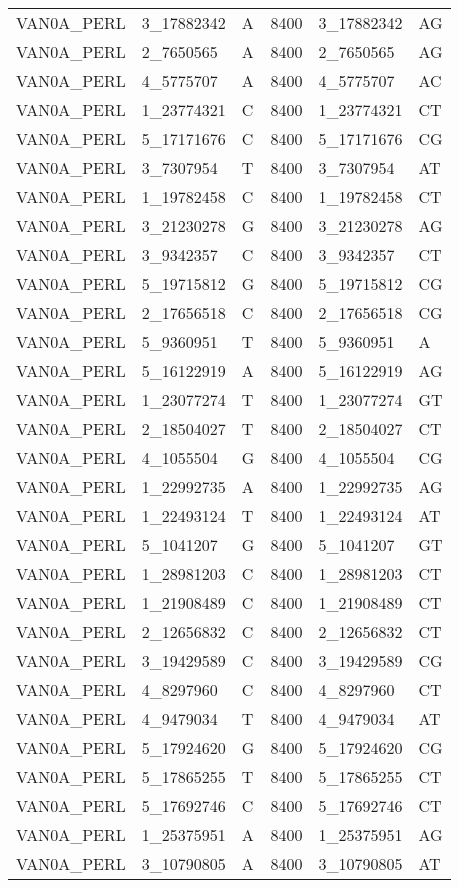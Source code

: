 \begin{center}
\begin{longtable}{|l|l|l|l|l|l|}
VAN0A\_PERL&3\_17882342&A&8400&3\_17882342&AG\\
VAN0A\_PERL&2\_7650565&A&8400&2\_7650565&AG\\
VAN0A\_PERL&4\_5775707&A&8400&4\_5775707&AC\\
VAN0A\_PERL&1\_23774321&C&8400&1\_23774321&CT\\
VAN0A\_PERL&5\_17171676&C&8400&5\_17171676&CG\\
VAN0A\_PERL&3\_7307954&T&8400&3\_7307954&AT\\
VAN0A\_PERL&1\_19782458&C&8400&1\_19782458&CT\\
VAN0A\_PERL&3\_21230278&G&8400&3\_21230278&AG\\
VAN0A\_PERL&3\_9342357&C&8400&3\_9342357&CT\\
VAN0A\_PERL&5\_19715812&G&8400&5\_19715812&CG\\
VAN0A\_PERL&2\_17656518&C&8400&2\_17656518&CG\\
VAN0A\_PERL&5\_9360951&T&8400&5\_9360951&A\\
VAN0A\_PERL&5\_16122919&A&8400&5\_16122919&AG\\
VAN0A\_PERL&1\_23077274&T&8400&1\_23077274&GT\\
VAN0A\_PERL&2\_18504027&T&8400&2\_18504027&CT\\
VAN0A\_PERL&4\_1055504&G&8400&4\_1055504&CG\\
VAN0A\_PERL&1\_22992735&A&8400&1\_22992735&AG\\
VAN0A\_PERL&1\_22493124&T&8400&1\_22493124&AT\\
VAN0A\_PERL&5\_1041207&G&8400&5\_1041207&GT\\
VAN0A\_PERL&1\_28981203&C&8400&1\_28981203&CT\\
VAN0A\_PERL&1\_21908489&C&8400&1\_21908489&CT\\
VAN0A\_PERL&2\_12656832&C&8400&2\_12656832&CT\\
VAN0A\_PERL&3\_19429589&C&8400&3\_19429589&CG\\
VAN0A\_PERL&4\_8297960&C&8400&4\_8297960&CT\\
VAN0A\_PERL&4\_9479034&T&8400&4\_9479034&AT\\
VAN0A\_PERL&5\_17924620&G&8400&5\_17924620&CG\\
VAN0A\_PERL&5\_17865255&T&8400&5\_17865255&CT\\
VAN0A\_PERL&5\_17692746&C&8400&5\_17692746&CT\\
VAN0A\_PERL&1\_25375951&A&8400&1\_25375951&AG\\
VAN0A\_PERL&3\_10790805&A&8400&3\_10790805&AT\\

\end{longtable}
\end{center}
